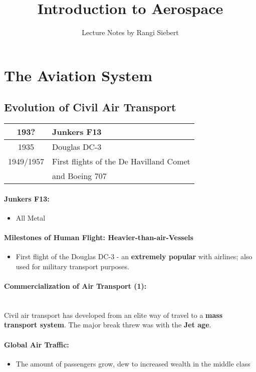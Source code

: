 \documentclass[twocolumn]{article}
\begin{document}
\title{Introduction to Aerospace}
\author{Lecture Notes by Rangi Siebert}
\maketitle
\tableofcontents
\section{The Aviation System}
	\subsection{Evolution of Civil Air Transport}
		\begin{center}
		\begin{tabular}{c|l}
		193? & Junkers F13 \\
		\hline
		1935 & Douglas DC-3 \\
		\hline
		1949/1957 & First flights of the De Havilland Comet\\& and Boeing 707 \\
		\end{tabular}
		\end{center}
		\paragraph{Junkers F13:}
			\begin{itemize}
			\item All Metal
			\end{itemize}
		\paragraph{Milestones of Human Flight: Heavier-than-air-Vessels}
			\begin{itemize}
			\item First flight of the Douglas DC-3 - an \textbf{extremely popular} with airlines; also used for military transport purposes.
			\end{itemize}
		\paragraph{Commercialization of Air Transport (1):}\mbox{}\\
			Civil air transport has developed from an elite way of travel to a \textbf{mass transport system}. The major break threw was with the \textbf{Jet age}.  
		\paragraph{Global Air Traffic:}
			\begin{itemize}
			\item The amount of passengers grow, dew to increased wealth in the middle class
			\end{itemize}	
\end{document}
